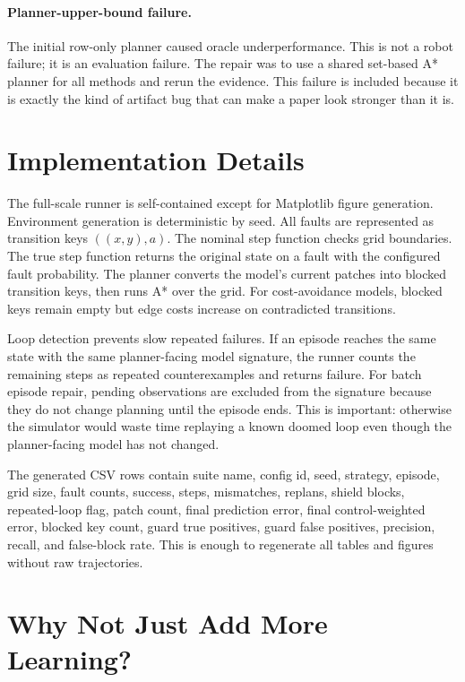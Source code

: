 \documentclass{article}
\begin{document}
\paragraph{Planner-upper-bound failure.}
The initial row-only planner caused oracle underperformance. This is not a robot failure; it is an evaluation failure. The repair was to use a shared set-based A* planner for all methods and rerun the evidence. This failure is included because it is exactly the kind of artifact bug that can make a paper look stronger than it is.

\section{Implementation Details}

The full-scale runner is self-contained except for Matplotlib figure generation. Environment generation is deterministic by seed. All faults are represented as transition keys $((x,y),a)$. The nominal step function checks grid boundaries. The true step function returns the original state on a fault with the configured fault probability. The planner converts the model's current patches into blocked transition keys, then runs A* over the grid. For cost-avoidance models, blocked keys remain empty but edge costs increase on contradicted transitions.

Loop detection prevents slow repeated failures. If an episode reaches the same state with the same planner-facing model signature, the runner counts the remaining steps as repeated counterexamples and returns failure. For batch episode repair, pending observations are excluded from the signature because they do not change planning until the episode ends. This is important: otherwise the simulator would waste time replaying a known doomed loop even though the planner-facing model has not changed.

The generated CSV rows contain suite name, config id, seed, strategy, episode, grid size, fault counts, success, steps, mismatches, replans, shield blocks, repeated-loop flag, patch count, final prediction error, final control-weighted error, blocked key count, guard true positives, guard false positives, precision, recall, and false-block rate. This is enough to regenerate all tables and figures without raw trajectories.

\section{Why Not Just Add More Learning?}
\end{document}
